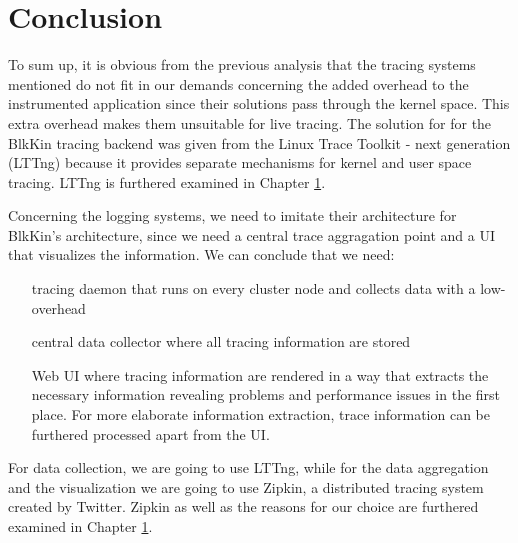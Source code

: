\section{Conclusion}
To sum up, it is obvious from the previous analysis that the tracing systems
mentioned do not fit in our demands concerning the added overhead to the
instrumented application since their solutions pass through the kernel space.
This extra overhead makes them unsuitable for live tracing. The solution for
for the BlkKin tracing backend was given from the Linux Trace Toolkit - next
generation (LTTng) because it provides separate mechanisms for kernel and user
space tracing. LTTng is furthered examined in Chapter \ref{}.

Concerning the logging systems, we need to imitate their architecture for
BlkKin's architecture, since we need a central trace aggragation point and a UI
that visualizes the information. We can conclude that we need:
\begin{itemize}
\item[tracing daemon] that runs on every cluster node and collects data  with a low-overhead
\item[central data collector] where all tracing information are stored
\item[Web UI] where tracing information are rendered in a way that extracts the necessary
information revealing problems and performance issues in the first place.
For more elaborate information extraction, trace information can be furthered
processed apart from the UI.  
\end{itemize}
For data collection, we are going to use LTTng, while for the data aggregation and the visualization we
are going to use Zipkin, a distributed tracing system created by Twitter. Zipkin
as well as the reasons for our choice are furthered examined in Chapter \ref{}.
